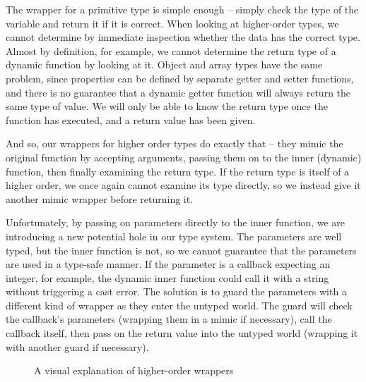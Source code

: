 \documentclass[12pt,a4paper,twoside,openright]{report}
\theoremstyle{definition}
\theoremstyle{dotless}
\begin{document}
The wrapper for a primitive type is simple enough -- simply check the type of
the variable and return it if it is correct. When looking at higher-order
types, we cannot determine by immediate inspection whether the data has the
correct type. Almost by definition, for example, we cannot determine the return
type of a dynamic function by looking at it. Object and array types have the
same problem, since properties can be defined by separate getter and setter
functions, and there is no guarantee that a dynamic getter function will always
return the same type of value. We will only be able to know the return type
once the function has executed, and a return value has been given.

And so, our wrappers for higher order types do exactly that -- they mimic the
original function by accepting arguments, passing them on to the inner
(dynamic) function, then finally examining the return type. If the return type
is itself of a higher order, we once again cannot examine its type directly, so
we instead give it another mimic wrapper before returning it. 

Unfortunately, by passing on parameters directly to the inner function, we are
introducing a new potential hole in our type system. The parameters are well
typed, but the inner function is not, so we cannot guarantee that the
parameters are used in a type-safe manner. If the parameter is a callback
expecting an integer, for example, the dynamic inner function could call it with a
string without triggering a cast error. The solution is to guard the parameters
with a different kind of wrapper as they enter the untyped world. The guard
will check the callback's parameters (wrapping them in a mimic if necessary),
call the callback itself, then pass on the return value into the untyped world
(wrapping it with another guard if necessary). 

\begin{figure}[h]
  \centering
  \caption{A visual explanation of higher-order wrappers}
  \label{fig:wrappers}
\end{figure}
\end{document}
